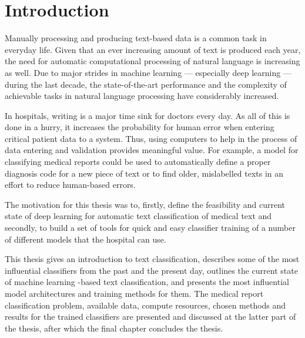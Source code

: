 \chapter{Introduction} \label{Introduction}

Manually processing and producing text-based data is a common task in everyday life.
Given that an ever increasing amount of text is produced each year, the need for automatic computational processing of natural language is increasing as well.
Due to major strides in machine learning --- especially deep learning --- during the last decade, the state-of-the-art performance and the complexity of achievable tasks in natural language processing have considerably increased.



In hospitals, writing is a major time sink for doctors every day.
As all of this is done in a hurry, it increases the probability for human error when entering critical patient data to a system.
Thus, using computers to help in the process of data entering and validation provides meaningful value.
For example, a model for classifying medical reports could be used to automatically define a proper diagnosis code for a new piece of text or to find older, mislabelled texts in an effort to reduce human-based errors.

The motivation for this thesis was to, firstly, define the feasibility and current state of deep learning for automatic text classification of medical text and secondly, to build a set of tools for quick and easy classifier training of a number of different models that the hospital can use.

This thesis gives an introduction to text classification, describes some of the most influential classifiers from the past and the present day, outlines the current state of machine learning -based text classification, and presents the most influential model architectures and training methods for them.
The medical report classification problem, available data, compute resources, chosen methods and results for the trained classifiers are presented and discussed at the latter part of the thesis, after which the final chapter concludes the thesis.
